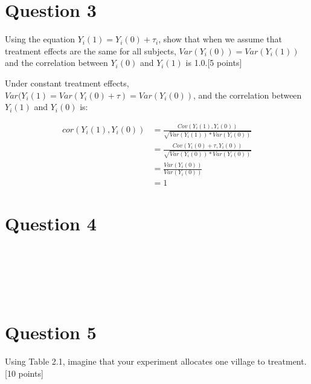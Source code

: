 \documentclass[11pt,notitlepage]{article}\usepackage[]{graphicx}\usepackage[]{color}
\makeatletter
\newenvironment{kframe}{%
 \def\at@end@of@kframe{}%
 \ifinner\ifhmode%
  \def\at@end@of@kframe{\end{minipage}}%
  \begin{minipage}{\columnwidth}%
 \fi\fi%
 \def\FrameCommand##1{\hskip\@totalleftmargin \hskip-\fboxsep
 \colorbox{shadecolor}{##1}\hskip-\fboxsep
     \hskip-\linewidth \hskip-\@totalleftmargin \hskip\columnwidth}%
 \MakeFramed {\advance\hsize-\width
   \@totalleftmargin\z@ \linewidth\hsize
   \@setminipage}}%
 {\par\unskip\endMakeFramed%
 \at@end@of@kframe}
\newenvironment{knitrout}{}{} %
\makeatother
\begin{document}
\section*{Question 3}
Using the equation $Y_i (1) = Y_i (0) + \tau_i$, show that when we assume that treatment effects are the same for all subjects, 
$Var(Y_i(0))= Var(Y_i(1))$ and the correlation between $Y_i (0)$ and $Y_i (1)$ is 1.0.[5 points]

Under constant treatment effects,  $Var(Y_i (1)=Var(Y_i (0)+\tau)=Var(Y_i (0))$, and the correlation between $Y_i(1)$ and $Y_i(0)$ is:

\begin{align*}
cor(Y_i(1), Y_i(0)) &= \frac{Cov(Y_i(1), Y_i(0))}{\sqrt{Var(Y_i(1)) * Var(Y_i(0))}} \\
&=\frac{Cov(Y_i(0) + \tau, Y_i(0))}{\sqrt{Var(Y_i(0)) * Var(Y_i(0))}} \\
& = \frac{Var(Y_{i}(0))}{Var(Y_{i}(0))}\\
&= 1
\end{align*}

\section*{Question 4}
\begin{knitrout}
\color{fgcolor}\begin{kframe}
\begin{verbatim}






\end{verbatim}
\end{kframe}
\end{knitrout}

\section*{Question 5}
Using Table 2.1, imagine that your experiment allocates one village to treatment. [10 points]
\end{document}
